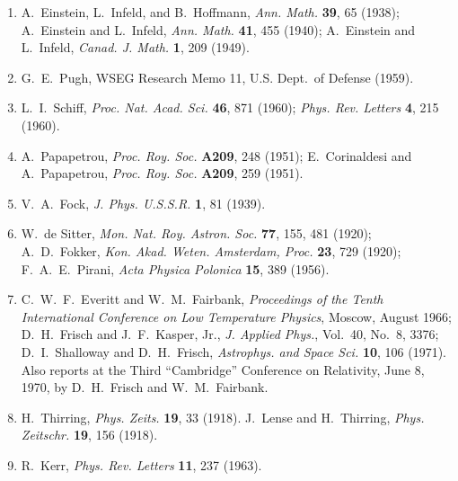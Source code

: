 \begingroup
\setlength{\emergencystretch}{2em}
\begin{enumerate}
  \item {}\label{ch9-ref-1}
  A.~Einstein, L.~Infeld, and B.~Hoffmann, \emph{Ann. Math.} \textbf{39},
  65 (1938); A.~Einstein and L.~Infeld, \emph{Ann. Math.} \textbf{41},
  455 (1940); A.~Einstein and L.~Infeld, \emph{Canad. J. Math.} \textbf{1},
  209 (1949).

  \item {}\label{ch9-ref-2}
  G.~E.~Pugh, WSEG Research Memo 11, U.S. Dept.\ of Defense (1959).

  \item {}\label{ch9-ref-3}
  L.~I.~Schiff, \emph{Proc. Nat. Acad. Sci.} \textbf{46}, 871 (1960);
  \emph{Phys. Rev. Letters} \textbf{4}, 215 (1960).

  \item {}\label{ch9-ref-4}
  A.~Papapetrou, \emph{Proc. Roy. Soc.} \textbf{A209}, 248 (1951);
  E.~Corinaldesi and A.~Papapetrou, \emph{Proc. Roy. Soc.} \textbf{A209},
  259 (1951).

  \item {}\label{ch9-ref-5}
  V.~A.~Fock, \emph{J. Phys. U.S.S.R.} \textbf{1}, 81 (1939).

  \item {}\label{ch9-ref-6}
  W.~de Sitter, \emph{Mon. Nat. Roy. Astron. Soc.} \textbf{77}, 155, 481
  (1920); A.~D.~Fokker, \emph{Kon. Akad. Weten. Amsterdam, Proc.}
  \textbf{23}, 729 (1920); F.~A.~E.~Pirani, \emph{Acta Physica Polonica}
  \textbf{15}, 389 (1956).

  \item {}\label{ch9-ref-7}
  C.~W.~F.~Everitt and W.~M.~Fairbank, \emph{Proceedings of the Tenth
  International Conference on Low Temperature Physics}, Moscow, August
  1966; D.~H.~Frisch and J.~F.~Kasper, Jr., \emph{J. Applied Phys.},
  Vol.~40, No.~8, 3376; D.~I.~Shalloway and D.~H.~Frisch,
  \emph{Astrophys. and Space Sci.} \textbf{10}, 106 (1971). Also reports
  at the Third ``Cambridge'' Conference on Relativity, June 8, 1970, by
  D.~H.~Frisch and W.~M.~Fairbank.

  \item {}\label{ch9-ref-8}
  H.~Thirring, \emph{Phys. Zeits.} \textbf{19}, 33 (1918). J.~Lense and
  H.~Thirring, \emph{Phys. Zeitschr.} \textbf{19}, 156 (1918).

  \item {}\label{ch9-ref-9}
  R.~Kerr, \emph{Phys. Rev. Letters} \textbf{11}, 237 (1963).


\end{enumerate}

